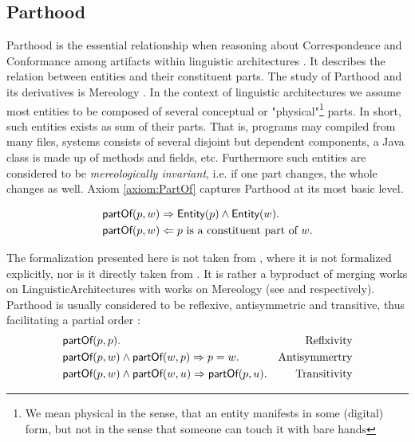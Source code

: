 \subsection{Parthood}
\label{subsection:Parthood}
\Gls{Parthood} is the essential relationship when reasoning about \gls{Correspondence} and \gls{Conformance} among artifacts within linguistic architectures \cite{DBLP:conf/sle/Lammel16} \cite{DBLP:conf/modelsward/HeinzLV17}.
It describes the relation between entities and their constituent parts.
The study of \gls{Parthood} and its derivatives is \gls{Mereology} \cite{DBLP:journals/dke/Varzi96} \cite{SEP:Mereology}.
In the context of linguistic architectures we assume most entities to be
composed of several conceptual or "physical"\footnote{We mean physical in the sense, that an entity manifests in some (digital) form, but not in the sense that someone can touch it with bare hands} parts.
In short, such entities exists as sum of their parts.
That is, programs may compiled from many files, systems consists of several disjoint but dependent components, a \gls{Java} class is made up of methods and fields, etc.
Furthermore such entities are considered to be \textit{mereologically invariant}, i.e. if one part changes, the whole changes as well. 
Axiom \ref{axiom:PartOf} captures \gls{Parthood} at its most basic level.
\begin{axiom}[\partOf]
\label{axiom:PartOf}
\begin{align*}
&\textsf{partOf}(p,w)
\Rightarrow
\textsf{Entity}(p) \wedge \textsf{Entity}(w).\\
&\textsf{partOf}(p,w)
\Leftarrow
p \text{ is a constituent part of } w.
\end{align*}
\end{axiom}
The formalization presented here is not taken from \cite{DBLP:conf/modelsward/HeinzLV17}, where it is not formalized explicitly, nor is it directly taken from \cite{DBLP:conf/sle/Lammel16}.
It is rather a byproduct of merging works on \glspl{LinguisticArchitecture} with works on \gls{Mereology} (see \cite{DBLP:conf/sle/Lammel16} \cite{DBLP:conf/modelsward/HeinzLV17} and \cite{DBLP:journals/dke/Varzi96} \cite{SEP:Mereology} respectively). 
\Gls{Parthood} is usually considered to be reflexive, antisymmetric and transitive, thus facilitating a partial order \cite{DBLP:journals/dke/Varzi96} \cite{SEP:Mereology}:
\begin{align*}
&\textsf{partOf}(p,p).
&\text{Reflxivity}
\\
&\textsf{partOf}(p,w) \wedge \textsf{partOf}(w,p) \Rightarrow p = w. 
&\text{Antisymmertry}
\\
&\textsf{partOf}(p,w) \wedge \textsf{partOf}(w,u) \Rightarrow \textsf{partOf}(p,u). 
&\text{Transitivity}
\end{align*}
